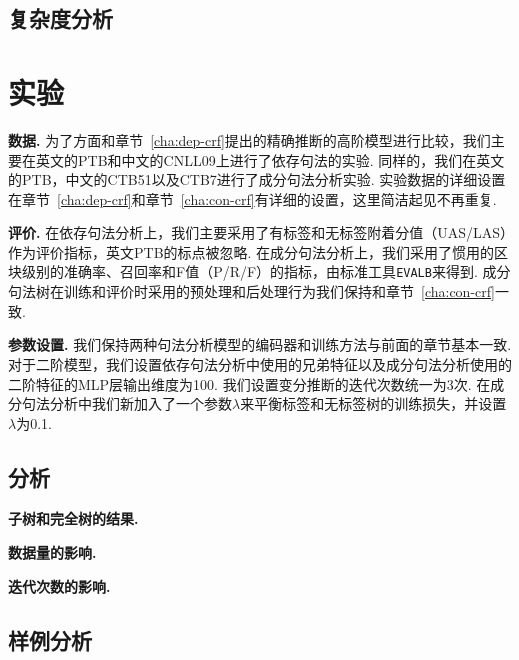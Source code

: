 \subsection{复杂度分析}

\section{实验}\label{sec:vi-exp}

\noindent\textbf{数据.}
为了方面和章节~\ref{cha:dep-crf}提出的精确推断的高阶模型进行比较，我们主要在英文的PTB和中文的CNLL09上进行了依存句法的实验.
同样的，我们在英文的PTB，中文的CTB51以及CTB7进行了成分句法分析实验.
实验数据的详细设置在章节~\ref{cha:dep-crf}和章节~\ref{cha:con-crf}有详细的设置，这里简洁起见不再重复.

\noindent\textbf{评价.}
在依存句法分析上，我们主要采用了有标签和无标签附着分值（UAS/LAS）作为评价指标，英文PTB的标点被忽略.
在成分句法分析上，我们采用了惯用的区块级别的准确率、召回率和F值（P/R/F）的指标，由标准工具\texttt{EVALB}来得到.
成分句法树在训练和评价时采用的预处理和后处理行为我们保持和章节~\ref{cha:con-crf}一致.

\noindent\textbf{参数设置.}
我们保持两种句法分析模型的编码器和训练方法与前面的章节基本一致.
对于二阶模型，我们设置依存句法分析中使用的兄弟特征以及成分句法分析使用的二阶特征的MLP层输出维度为100.
我们设置变分推断的迭代次数统一为3次.
在成分句法分析中我们新加入了一个参数$\lambda$来平衡标签和无标签树的训练损失，并设置$\lambda$为0.1.



\subsection{分析}

\noindent\textbf{子树和完全树的结果.}

\noindent\textbf{数据量的影响.}

\noindent\textbf{迭代次数的影响.}

\subsection{样例分析}

